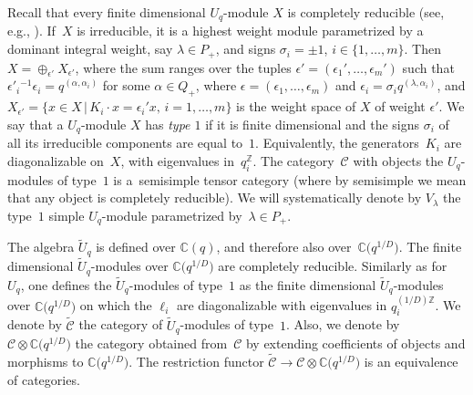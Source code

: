 \documentclass[pdftex]{sigma}%
\numberwithin{equation}{section}
\numberwithin{figure}{section}
\newcommand{\e}{\epsilon}
\newcommand{\mc}{\mathbb{C}}
\newcommand{\mz}{\mathbb{Z}}
\newcommand{\ra}{\rightarrow}
\begin{document}
Recall that every finite dimensional $U_q$-module $X$ is completely reducible (see, e.g., \cite[Theorem~10.1.7]{CP}). If~$X$ is irreducible, it is a highest weight module parametrized by a dominant integral weight, say $\lambda\in P_+$, and signs $\sigma_i = \pm 1$, $i\in \{1,\dots,m\}$. Then $X = \oplus_{\e'} X_{\e'}$, where the sum ranges over the tuples $\e' = (\e_1',\dots,\e_m')$ such that $\e'_i{}^{-1}\e_i = q^{(\alpha,\alpha_i)}$ for some $\alpha\in Q_+$, where $\e = (\e_1,\dots,\e_m)$ and $\e_i = \sigma_iq^{(\lambda,\alpha_i)}$, and $X_{\e'}=\{x\in X\, \vert\, K_i\cdot x= \e_i' x,\, i=1,\dots,m\}$ is the weight space of $X$ of weight $\e'$. We say that a $U_q$-module $X$ has {\it type $1$} if it is finite dimensional and the signs $\sigma_i$ of all its irreducible components are equal to~$1$. Equivalently, the generators~$K_i$ are diagonalizable on~$X$, with eigenvalues in~$q_i^{\mz}$. The category~${\mathcal C}$ with objects the $U_q$-modules of type~$1$ is a~semisimple tensor category (where by semisimple we mean that any object is completely reducible). We will systematically denote by $V_\lambda$ the type~$1$ simple $U_q$-module parametrized by~$\lambda\in P_+$.

The algebra $\tilde U_q$ is defined over $\mc(q)$, and therefore also over~$\mc\big(q^{1/D}\big)$. The finite dimensional $\tilde U_q$-modules over $\mc\big(q^{1/D}\big)$ are completely reducible. Similarly as for~$U_q$, one defines the $\tilde U_q$-modules of type~$1$ as the finite dimensional $\tilde U_q$-modules over $\mc\big(q^{1/D}\big)$ on which the $\ell_i$ are diagonalizable with eigenvalues in $q_i^{(1/D)\mz}$. We denote by $\tilde {\mathcal C}$ the category of $\tilde U_q$-modules of type~$1$. Also, we denote by $\mathcal C \otimes \mc\big(q^{1/D}\big)$ the category obtained from~$\mathcal C$ by extending coefficients of objects and morphisms to $\mc\big(q^{1/D}\big)$. The restriction functor $\tilde{\mathcal C} \ra \mathcal C \otimes \mc\big(q^{1/D}\big)$ is an equivalence of categories.
\end{document}
